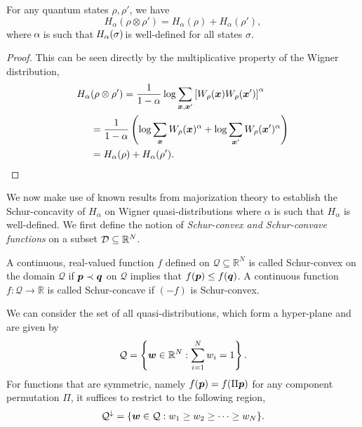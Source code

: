 \documentclass[pra,
aps,
twocolumn,
superscriptaddress,
groupedaddress,
nofootinbib,
reprint
]{revtex4-1}
\begin{document}
\begin{lemma}\label{H_add}
	For any quantum states $\rho, \rho'$, we have
	\begin{equation}
		H_{\alpha}(\rho \otimes \rho') = H_{\alpha}(\rho) + H_{\alpha}(\rho'),
	\end{equation}
	where $\hspace{-1pt}\alpha\hspace{-1pt}$ is such that $\hspace{-1pt}H_\alpha(\sigma)\hspace{-2pt}$ is well-defined for all states $\sigma$.
\end{lemma}
\begin{proof}
	This can be seen directly by the multiplicative property of the Wigner distribution,
	\begin{align*}
		H_{\alpha}&(\rho \otimes \rho') = \frac{1}{1-\alpha}\log \sum_{\bm{x},\bm{x}'} \left[W_{\rho}(\bm{x})W_{\rho}(\bm{x}')\right]^{\alpha} \\
		&= \frac{1}{1-\alpha}\left( \log \sum_{\bm{x}}W_{\rho}(\bm{x})^{\alpha} + \log \sum_{\bm{x}'}W_{\rho}(\bm{x}')^{\alpha} \right) \\
		&= H_{\alpha}(\rho) + H_{\alpha}(\rho').
	\end{align*}
\end{proof}


We now make use of known results from majorization theory to establish the Schur-concavity of $H_\alpha$ on Wigner quasi-distributions where $\alpha$ is such that $H_\alpha$ is well-defined. 
We first define the notion of \emph{Schur-convex and Schur-convave functions} on a subset ${\mathcal D} \subseteq \mathbb{R}^N$.

\begin{definition} 
A continuous, real-valued function $f$ defined on $\mathcal{Q} \subseteq \mathbb{R}^N$ is called Schur-convex on the domain $\mathcal{Q}$ if $\boldsymbol{p} \prec \boldsymbol{q}$ on $\mathcal{Q}$ implies that $f(\boldsymbol{p}) \le f(\boldsymbol{q})$. A continuous function $f:\mathcal{Q} \rightarrow \mathbb{R}$ is called Schur-concave if $(-f)$ is Schur-convex.
\end{definition}
We can consider the set of all quasi-distributions, which form a hyper-plane and are given by
\begin{equation}
\mathcal{Q} = \left\{ \boldsymbol{w} \in \mathbb{R}^N: \sum_{i=1}^N w_i = 1 \right\}.
\end{equation}
For functions that are symmetric, namely $f(\boldsymbol{p}) = f(\Pi \boldsymbol{p})$ for any component permutation $\Pi$, it suffices to restrict to the following region,
\begin{equation}
\mathcal{Q}^\downarrow = \{ \boldsymbol{w} \in \mathcal{Q} : w_1 \ge w_2 \ge \cdots \ge w_N\}.
\end{equation}
\end{document}
